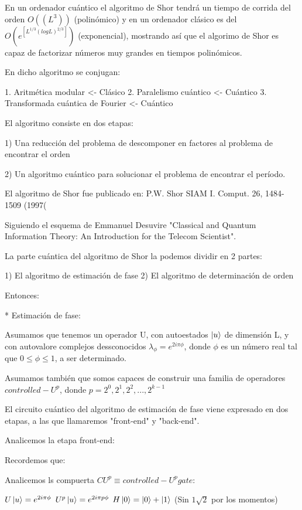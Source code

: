 \documentclass[11pt, spanish]{report}
\begin{document}
En un ordenador cuántico el algoritmo de Shor tendrá un tiempo de corrida del orden $O((L^3))$ (polinómico) y en un ordenador clásico es del $O(e^[L^{1/3} (log L)^{2/3}])$ (exponencial), mostrando así que el algorimo de Shor es capaz de factorizar números muy grandes en tiempos polinómicos.

En dicho algoritmo se conjugan:

1. Aritmética modular <- Clásico
2. Paralelismo cuántico <- Cuántico
3. Transformada cuántica de Fourier <- Cuántico

El algoritmo consiste en dos etapas:

1) Una reducción del problema de descomponer en factores al problema de encontrar el orden

2) Un algoritmo cuántico para solucionar el problema de encontrar el período.

El algoritmo de Shor fue publicado en: P.W. Shor SIAM I. Comput. 26, 1484-1509 (1997(

Siguiendo el esquema de Emmanuel Desuvire "Classical and Quantum Information Theory: An Introduction for the Telecom Scientist".

La parte cuántica del algoritmo de Shor la podemos dividir en 2 partes:

1) El algoritmo de estimación de fase
2) El algoritmo de determinación de orden

Entonces:

* Estimación de fase:

Asumamos que tenemos un operador U, con autoestados $\ket{u}$ de dimensión L, y con autovalore complejos dessconocidos $\lambda_\phi = e^{2 i \pi \phi}$, donde $\phi$ es un número real tal que $0 \leq \phi \leq 1$, a ser determinado.

Asumamos también que somos capaces de construir una familia de operadores $controlled-U^p$, donde $p = 2^0, 2^1, 2^2, ..., 2^{k-1}$

El circuito cuántico del algoritmo de estimación de fase viene expresado en dos etapas, a las que llamaremos "front-end" y "back-end".

Analicemos la etapa front-end:


Recordemos que:


Analicemos ls compuerta $CU^p \equiv controlled-U^p gate$:


$U \ket{u} = e^{2 i \pi \phi}$
$U^p \ket{u} = e^{2 i \pi p \phi}$
$H \ket{0} = \ket{0} + \ket{1}$ (Sin $1\sqrt{2}$ por los momentos)
\end{document}
